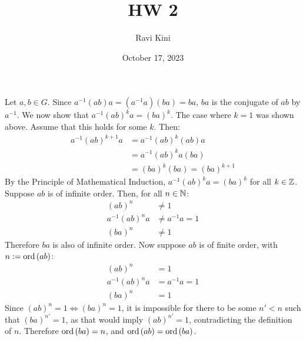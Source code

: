 \documentclass{article}
\title{HW 2}
\author{Ravi Kini}
\date{October 17, 2023}
\begin{document}
\maketitle

\problem
Let $a,b \in G$. Since $a^{-1}\left(ab\right)a = \left(a^{-1}a\right)\left(ba\right) = ba$, $ba$ is the conjugate of $ab$ by $a^{-1}$. We now show that $a^{-1}\left(ab\right)^ka = \left(ba\right)^k$. The case where $k = 1$ was shown above. Assume that this holds for some $k$. Then:
\begin{equation}
    \begin{split}
        a^{-1}\left(ab\right)^{k + 1}a & = a^{-1}\left(ab\right)^{k}\left(ab\right)a \\
        & = a^{-1}\left(ab\right)^{k}a\left(ba\right) \\
        & = \left(ba\right)^k\left(ba\right) = \left(ba\right)^{k + 1}
    \end{split}
\end{equation}
By the Principle of Mathematical Induction, $a^{-1}\left(ab\right)^ka = \left(ba\right)^k$ for all $k \in \mathbb{Z}$. Suppose $ab$ is of infinite order. Then, for all $n \in \mathbb{N}$:
\begin{equation}
    \begin{split}
        \left(ab\right)^n & \neq 1 \\
        a^{-1}\left(ab\right)^na & \neq a^{-1}a = 1 \\
        \left(ba\right)^n & \neq 1
    \end{split}
\end{equation}
Therefore $ba$ is also of infinite order. Now suppose $ab$ is of finite order, with $n := \operatorname{ord}\left(ab\right)$:
\begin{equation}
    \begin{split}
        \left(ab\right)^n & = 1 \\
        a^{-1}\left(ab\right)^na & = a^{-1}a = 1 \\
        \left(ba\right)^n & = 1
    \end{split}
\end{equation}
Since $\left(ab\right)^n = 1 \iff \left(ba\right)^n = 1$, it is impossible for there to be some $n' < n$ such that $\left(ba\right)^{n'} = 1$, as that would imply $\left(ab\right)^{n'} = 1$, contradicting the definition of $n$. Therefore $\operatorname{ord}\left(ba\right) = n$, and $\operatorname{ord}\left(ab\right) = \operatorname{ord}\left(ba\right)$.

\newpage

\end{document}
